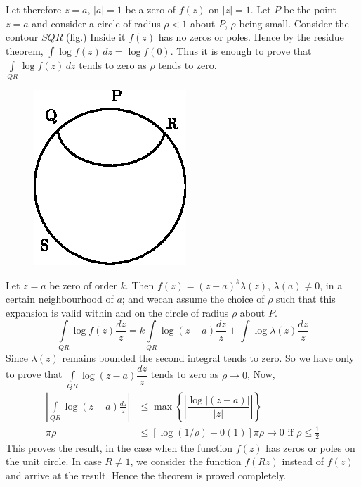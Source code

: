 Let therefore $z=a$, $|a|=1$ be a zero of $f(z)$ on $|z|=1$. Let $P$
be the point $z=a$ and consider a circle of radius $\rho<1$ about $P$,
$\rho$ being small. Consider the contour $SQR$ (fig.)
Inside it $f(z)$ has no zeros or poles. Hence by the residue theorem,
$\int\limits \log f(z)\, dz=\log f(0)$. Thus it is enough to prove that
$\int\limits_{QR}\log f(z)\,dz$ tends to zero as $\rho$ tends to zero.
\begin{figure}[H]
\centering
\includegraphics{hayman_fig1.eps}
\end{figure}

Let $z=a$ be zero of order $k$. Then $f(z)=(z-a)^{k}\lambda(z)$,
$\lambda(a)\neq 0$, in a certain neighbourhood of $a$; and
we\pageoriginale can assume the choice of $\rho$ such that this
expansion is valid within and on the circle of radius $\rho$ about
$P$.
$$
\int\limits_{QR}\log f(z)\dfrac{dz}{z}=k\int\limits_{QR}\log(z-a)\frac{dz}{z}+\int\limits
\log \lambda(z)\frac{dz}{z}
$$
Since $\lambda(z)$ remains bounded the second integral tends to
zero. So we have only to prove that $\int\limits_{QR}\log(z-a)\dfrac{dz}{z}$
tends to zero as $\rho\to 0$, Now,
\begin{align*}
\left| \int\limits_{QR}\log (z-a)\frac{dz}{z}\right| & \leq \max
\left\{\left|\dfrac{\log |(z-a)|}{|z|}\right|\right\}\\
\pi\rho & \leq [\log
  (1/\rho)+0(1)]\pi \rho\to 0 \text{ \ if \ } \rho\leq \frac{1}{2}
\end{align*}
This proves the result, in the case when the function $f(z)$ has zeros
or poles on the unit circle. In case $R\neq 1$, we consider the
function $f(Rz)$ instead of $f(z)$ and arrive at the result. Hence the
theorem is proved completely.

